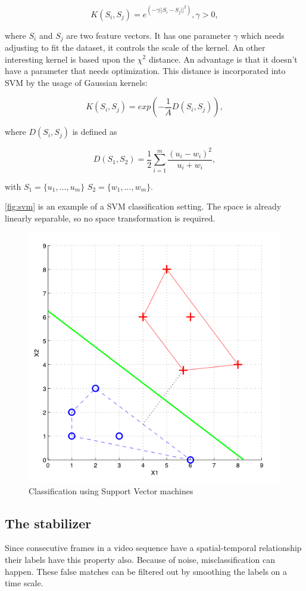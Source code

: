 \begin{equation}
	K(S_i,S_j) = e^{(-\gamma||S_i-S_j||^2)}, \gamma > 0,
\end{equation}

where $S_i$ and $S_j$ are two feature vectors. It has one parameter $\gamma$ which needs adjusting to fit the dataset, it controls the scale of the kernel. An other interesting kernel is based upon the $\chi^2$ distance\citep{Zhang2007}. An advantage is that it doesn't have a parameter that needs optimization. This distance is incorporated into SVM by the usage of Gaussian kernels\citep{Chapelle1999}:

\begin{equation}
	K(S_i,S_j) = exp(-\frac{1}{A}D(S_i,S_j)),
\end{equation}

where $D(S_i,S_j)$ is defined as

\begin{equation}
	D(S_1,S_2) = \frac{1}{2}\sum^{m}_{i=1}\frac{(u_i-w_i)^2}{u_i+w_i},
\end{equation}

with $S_1 = \{u_1, ... , u_m\}$ $S_2 = \{w_1, ... , w_m\}$.

\autoref{fig:svm} is an example of a SVM classification setting. The space is already linearly separable, so no space transformation is required. 

\begin{figure}[htbp]
\center{}
\includegraphics[width=0.5\linewidth]{figures/svm2.png}
\caption{Classification using Support Vector machines}
\label{fig:svm}
\end{figure}




\subsection*{The stabilizer}
\label{subsec:stabilizer}
Since consecutive frames in a video sequence have a spatial-temporal relationship their labels have this property also. Because of noise, misclassification can happen. These false matches can be filtered out by smoothing the labels on a time scale.

